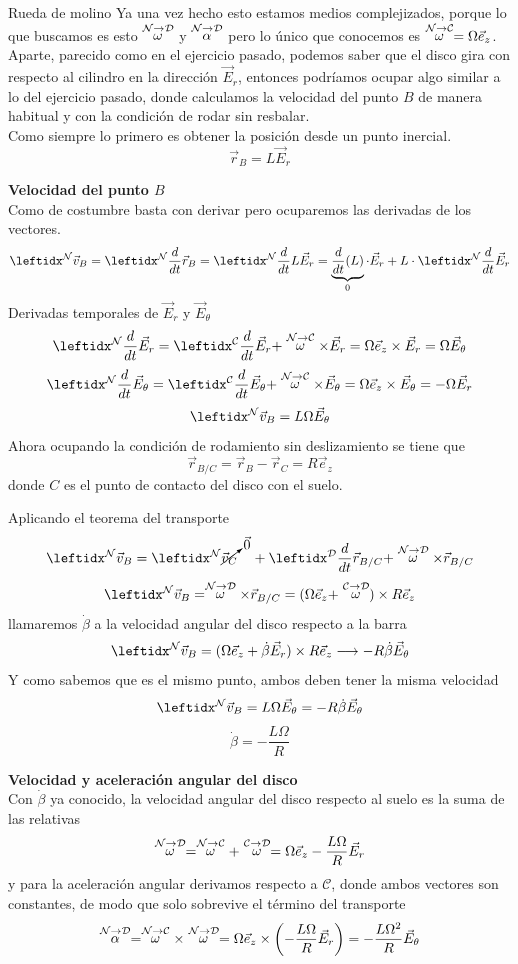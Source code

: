 \begin{solucion}{Rueda de molino}
Ya una vez hecho esto estamos medios complejizados, porque lo que buscamos es esto $\stackrel{\mathcal{N} \to \mathcal{D}}{\omega}$ y $\stackrel{\mathcal{N} \to \mathcal{D}}{\alpha}$ pero lo único que conocemos es $\stackrel{\mathcal{N} \to \mathcal{C}}{\omega}=\Omega\vec{e}_z$. Aparte, parecido como en el ejercicio pasado, podemos saber que el disco gira con respecto al cilindro en la dirección $\vec{E}_r$, entonces podríamos ocupar algo similar a lo del ejercicio pasado, donde calculamos la velocidad del punto $B$ de manera habitual y con la condición de rodar sin resbalar.\\
Como siempre lo primero es obtener la posición desde un punto inercial.
$$\vec{r}_B=L\vec{E}_r$$

\textbf{Velocidad del punto $B$}\\
Como de costumbre basta con derivar pero ocuparemos las derivadas de los vectores.
$$\marc{\vec{v}_B}{N}=\der{\vec{r}_B}{N}=\der{L\vec{E}_r}{N}=\underbrace{\dfrac{d}{dt}(L)}_{0}\cdot\vec{E}_r+L\cdot\der{\vec{E}_r}{N}{}$$
Derivadas temporales de $\vec{E}_r$ y $\vec{E}_\theta$
$$\transport{\vec{E}_r}{N}{C}=\Omega\vec{e}_z\times\vec{E}_r=\Omega\vec{E}_\theta $$
$$\transport{\vec{E}_\theta}{N}{C}=\Omega\vec{e}_z\times\vec{E}_\theta=-\Omega\vec{E}_r $$
$$\marc{\vec{v}_B}{N}=L\Omega\vec{E}_\theta$$
Ahora ocupando la condición de rodamiento sin deslizamiento se tiene que
$$\vec{r}_{B/C}=\vec{r}_B-\vec{r}_C=R\vec{e}_z$$
donde $C$ es el punto de contacto del disco con el suelo.

Aplicando el teorema del transporte
$$\marc{\vec{v}_B}{N}=\marc{}{N}\cancelto{\vec{0}}{\vec{v}_C} \quad+ \transporta{\vec{r}_{B/C}}{N}{D}$$
$$\marc{\vec{v}_B}{N}=\velang{N}{D}\times\vec{r}_{B/C}=(\Omega\vec{e}_z+\velang{C}{D})\times R\vec{e}_z$$
llamaremos $\dot\beta$ a la velocidad angular del disco respecto a la barra
$$\marc{\vec{v}_B}{N}=(\Omega\vec{e}_z+\dot\beta\vec{E}_r)\times R\vec{e}_z\longrightarrow -R\dot\beta\vec{E}_\theta$$
Y como sabemos que es el mismo punto, ambos deben tener la misma velocidad
$$\marc{}{N}\vec{v}_B=L\Omega\vec{E}_\theta=-R\dot\beta\vec{E}_\theta$$
$$\dot\beta=-\dfrac{L\Omega}{R}$$

\textbf{Velocidad y aceleración angular del disco}\\
Con $\dot\beta$ ya conocido, la velocidad angular del disco respecto al suelo es la suma de las relativas
$$\stackrel{\mathcal{N} \to \mathcal{D}}{\omega}=\stackrel{\mathcal{N} \to \mathcal{C}}{\omega}+\stackrel{\mathcal{C} \to \mathcal{D}}{\omega}=\Omega\vec{e}_z-\dfrac{L\Omega}{R}\vec{E}_r$$
y para la aceleración angular derivamos respecto a $\mathcal{C}$, donde ambos vectores son constantes, de modo que solo sobrevive el término del transporte
$$\stackrel{\mathcal{N} \to \mathcal{D}}{\alpha}=\stackrel{\mathcal{N} \to \mathcal{C}}{\omega}\times\stackrel{\mathcal{N} \to \mathcal{D}}{\omega}=\Omega\vec{e}_z\times\left(-\dfrac{L\Omega}{R}\vec{E}_r\right)=-\dfrac{L\Omega^2}{R}\vec{E}_\theta$$

\end{solucion}

